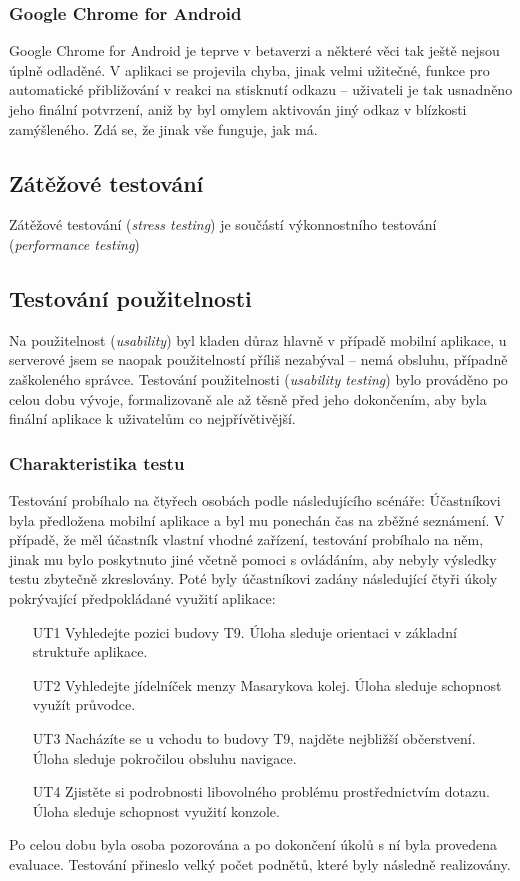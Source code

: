 \subsubsection{Google Chrome for Android}
Google Chrome for Android je teprve v betaverzi a některé věci tak ještě nejsou úplně odladěné. V aplikaci se projevila chyba, jinak velmi užitečné, funkce pro automatické přibližování v reakci na stisknutí odkazu -- uživateli je tak usnadněno jeho finální potvrzení, aniž by byl omylem aktivován jiný odkaz v blízkosti zamýšleného. Zdá se, že jinak vše funguje, jak má.


\subsection{Zátěžové testování}
Zátěžové testování (\textit{stress testing}) je součástí výkonnostního testování (\textit{performance testing})

\subsection{Testování použitelnosti}
Na použitelnost (\textit{usability}) byl kladen důraz hlavně v případě mobilní aplikace, u serverové jsem se naopak použitelností příliš nezabýval -- nemá obsluhu, případně zaškoleného správce. Testování použitelnosti (\textit{usability testing}) bylo prováděno po celou dobu vývoje, formalizovaně ale až těsně před jeho dokončením, aby byla finální aplikace k uživatelům co nejpřívětivější.

\subsubsection{Charakteristika testu}
Testování probíhalo na čtyřech osobách podle následujícího scénáře: Účastníkovi byla předložena mobilní aplikace a byl mu ponechán čas na zběžné seznámení. V případě, že měl účastník vlastní vhodné zařízení, testování probíhalo na něm, jinak mu bylo poskytnuto jiné včetně pomoci s ovládáním, aby nebyly výsledky testu zbytečně zkreslovány. Poté byly účastníkovi zadány následující čtyři úkoly pokrývající předpokládané využití aplikace:
\begin{enumerate}
 \item[UT1] Vyhledejte pozici budovy T9. Úloha sleduje orientaci v základní struktuře aplikace.
 \item[UT2] Vyhledejte jídelníček menzy Masarykova kolej. Úloha sleduje schopnost využít průvodce.
 \item[UT3] Nacházíte se u vchodu to budovy T9, najděte nejbližší občerstvení. Úloha sleduje pokročilou obsluhu navigace.
 \item[UT4] Zjistěte si podrobnosti libovolného problému prostřednictvím  dotazu. Úloha sleduje schopnost využití  konzole.
\end{enumerate}
Po celou dobu byla osoba pozorována a po dokončení úkolů s ní byla provedena evaluace. Testování přineslo velký počet podnětů, které byly následně realizovány.

